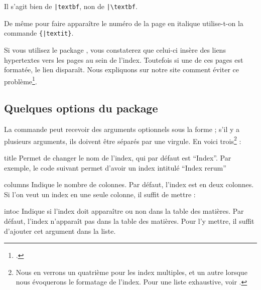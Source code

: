 \begin{attention}
Il s'agit bien de \verb+|textbf+, non de \verb+|\textbf+.
\end{attention}

De même pour faire apparaître le numéro de la page en italique utilise-t-on la commande \verb|{|\verb+|textit}+.





\begin{plusloins}
Si vous utilisez le package , vous constaterez que celui-ci insère des liens hypertextes vers les pages au sein de l'index. Toutefois si une de ces pages est formatée, le lien disparaît. Nous expliquons sur notre site comment éviter ce problème\footcite{indexhypergras}.
\end{plusloins}


\subsection{Quelques options du package }



La commande  peut recevoir des arguments optionnels sous la forme  ; s'il y a plusieurs arguments, ils doivent être séparés par une virgule. En voici trois\footnote{Nous en verrons un quatrième pour les index multiples, et un autre lorsque nous évoquerons le formatage de l'index. Pour une liste exhaustive, voir \cite{imakeidx}.} :
\begin{choix}
\item[title] Permet de changer le nom de l'index, qui par défaut est \enquote{Index}. Par exemple, le code suivant permet d'avoir un index intitulé \enquote{Index rerum} 

\begin{latexcode}
\makeindex[title = Index rerum]
\end{latexcode}

\item[columns] Indique le nombre de colonnes. Par défaut, l'index est en deux colonnes. Si l'on veut un index en une seule colonne, il suffit  de mettre  :

\begin{latexcode}
\makeindex[title = Index rerum, columns = 1]
\end{latexcode}

\item[intoc] Indique si l'index doit apparaître ou non dans la table des matières. Par défaut, l'index n'apparaît pas dans la table des matières. Pour l'y mettre, il suffit d'ajouter cet argument dans la liste. 

\begin{latexcode}
\makeindex[title = Index rerum, columns = 1, intoc]
\end{latexcode}
\end{choix}

